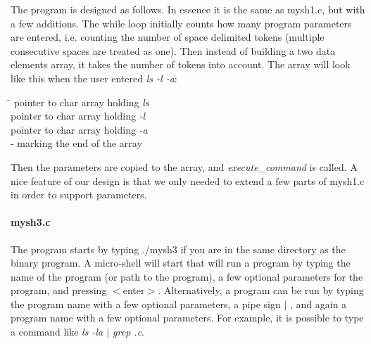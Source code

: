 \documentclass[a4paper,10pt]{article}
\begin{document}
The program is designed as follows. In essence it is the same as mysh1.c, but with a few additions. The while loop initially counts how many program parameters are entered, i.e. counting the number of space delimited tokens (multiple consecutive spaces are treated as one). Then instead of building a two data elements array, it takes the number of tokens into account. The array will look like this when the user entered \emph{ls -l -a}:
\begin{tabbing}
\hspace{20pt}\=\kill
 \> [0] pointer to char array holding \emph{ls}\\ 
 \> [1] pointer to char array holding \emph{-l}\\
 \> [2] pointer to char array holding \emph{-a}\\
  - marking the end of the array
\end{tabbing}
Then the parameters are copied to the array, and \emph{execute\_command} is called.
A nice feature of our design is that we only needed to extend a few parts of mysh1.c in order to support parameters.

\paragraph{mysh3.c} The program starts by typing ./mysh3 if you are in the same directory as the binary program. A micro-shell will start that will run a program by typing the name of the program (or path to the program), a few optional parameters for the program, and pressing $<$enter$>$. Alternatively, a program can be run by typing the program name with a few optional parameters, a pipe sign $\mid$ , and again a program name with a few optional parameters. For example, it is possible to type a command like \emph{ls -la $\mid$ grep .c}.
\end{document}

